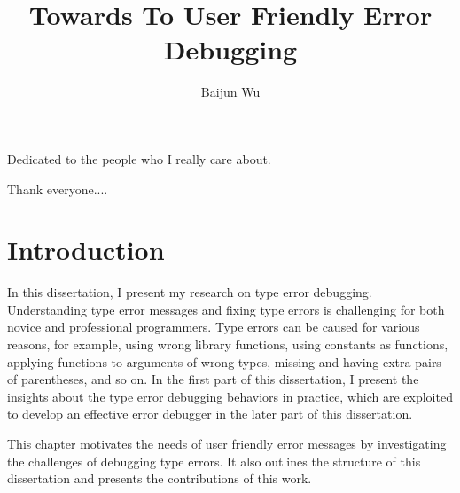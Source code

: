 \documentclass[12pt]{report}	%
\author{Baijun Wu}
\title{Towards To User Friendly Error Debugging}
\begin{document}
\titlepage              %

\copyrightpage          %

\approvalpage           %

%
%
%
\begin{dedication}
Dedicated to the people who I really care about.
\end{dedication}

\begin{acknowledgments}		%
Thank everyone....
\end{acknowledgments}

\tableofcontents   
\listoftables      
\listoffigures     

%
%
%
%

\chapter{Introduction}

In this dissertation, I present my research on type error debugging.
Understanding type error messages and fixing type errors is challenging for both novice and professional programmers.
Type errors can be caused for various reasons, for example, 
using wrong library functions,
using constants as functions, 
applying functions to arguments of wrong types, 
missing and having extra pairs of parentheses, and so on. 
In the first part of this dissertation, I present the insights about the type error debugging behaviors in practice, 
which are exploited to develop an effective error debugger in the later part of this dissertation.

This chapter motivates the needs of user friendly error messages
by investigating the challenges of debugging type errors.
It also outlines the structure of this dissertation and presents the contributions of this work.
\end{document}
